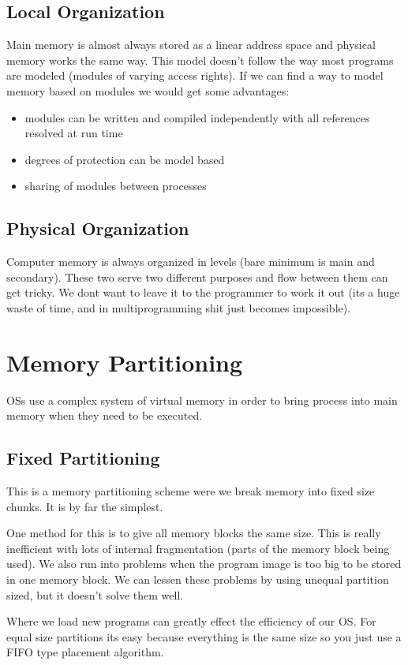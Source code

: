 \documentclass[12pt]{article}
\begin{document}
\subsection{Local Organization}
Main memory is almost always stored as a linear address space and physical memory works the same way. This model doesn't follow the way most programs are modeled (modules of varying access rights). If we can find a way to model memory based on modules we would get some advantages:
\begin{itemize}
  \item modules can be written and compiled independently with all references resolved at run time
  \item degrees of protection can be model based
  \item sharing of modules between processes
\end{itemize}

\subsection{Physical Organization}
Computer memory is always organized in levels (bare minimum is main and secondary). These two serve two different purposes and flow between them can get tricky. We dont want to leave it to the programmer to work it out (its a huge waste of time, and in multiprogramming shit just becomes impossible).

\section{Memory Partitioning}
OSs use a complex system of virtual memory in order to bring process into main memory when they need to be executed.

\subsection{Fixed Partitioning}
This is a memory partitioning scheme were we break memory into fixed size chunks. It is by far the simplest.

One method for this is to give all memory blocks the same size. This is really inefficient with lots of internal fragmentation (parts of the memory block being used). We also run into problems when the program image is too big to be stored in one memory block. We can lessen these problems by using unequal partition sized, but it doesn't solve them well.

Where we load new programs can greatly effect the efficiency of our OS. For equal size partitions its easy because everything is the same size so you just use a FIFO type placement algorithm.
\end{document}
